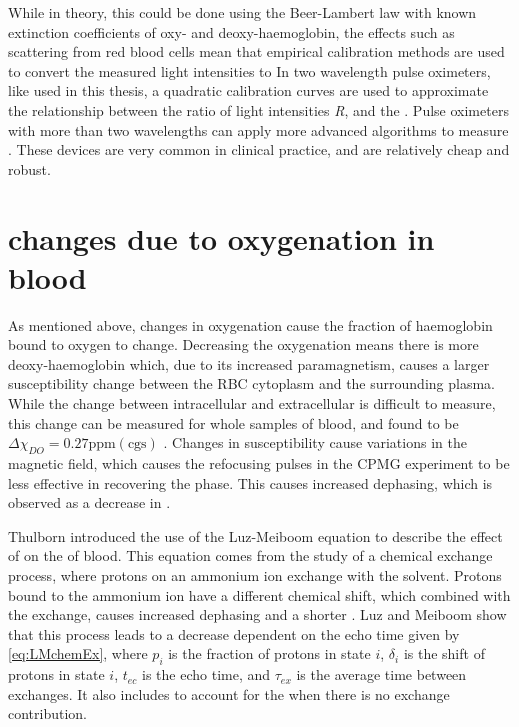 While in theory, this could be done using the Beer-Lambert law with known extinction coefficients of oxy- and deoxy-haemoglobin, the effects such as scattering from red blood cells mean that empirical calibration methods are used to convert the measured light intensities to \SOtwo \cite{WiebenLightAbsorbancePulse1997}
In two wavelength pulse oximeters, like used in this thesis, a quadratic calibration curves are used to approximate the relationship between the ratio of light intensities \textit{R}, and the \SOtwo.
Pulse oximeters with more than two wavelengths can apply more advanced algorithms to measure \SOtwo.
These devices are very common in clinical practice, and are relatively cheap and robust.

\section{\Ttwo changes due to oxygenation in blood}
\label{sec:back-T2SO2}
As mentioned above, changes in oxygenation cause the fraction of haemoglobin bound to oxygen to change.
Decreasing the oxygenation means there is more deoxy-haemoglobin which, due to its increased paramagnetism, causes a larger susceptibility change between the RBC cytoplasm and the surrounding plasma.
While the change between intracellular and extracellular is difficult to measure, this change can be measured for whole samples of blood, and found to be $\Delta\chi_{DO} = 0.27 \mathrm{ppm  (cgs)}$ \cite{JainInvestigatingmagneticsusceptibility2012}.
Changes in susceptibility cause variations in the magnetic field, which causes the refocusing pulses in the CPMG experiment to be less effective in recovering the phase.
This causes increased dephasing, which is observed as a decrease in \Ttwo.

Thulborn introduced the use of the Luz-Meiboom equation to describe the effect of \SOtwo on the \Ttwo of blood.
This equation comes from the study of a chemical exchange process, where protons on an ammonium ion exchange with the solvent\cite{LuzNuclearMagneticResonance1963}.
Protons bound to the ammonium ion have a different chemical shift, which combined with the exchange, causes increased dephasing and a shorter \Ttwo.
Luz and Meiboom show that this process leads to a \Ttwo decrease dependent on the echo time given by \autoref{eq:LMchemEx}\cite{LuzNuclearMagneticResonance1963}, where $p_i$ is the fraction of protons in state $i$, $\delta_i$ is the shift of protons in state $i$, $t_{ec}$ is the echo time, and $\tau_{ex}$ is the average time between exchanges. It also includes \TtwoO to account for the \Ttwo when there is no exchange contribution.

